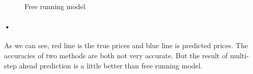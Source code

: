 \documentclass{article}
\begin{document}
\begin{figure}[htbp]
 \centering
 \caption{Free running model}
\end{figure}
\paragraph{•}As we can see, red line is the true prices and blue line is predicted prices. The accuracies of two methods are both not very accurate. But the result of multi-step ahead prediction is a little better than free running model. 
\newpage 
\end{document}
